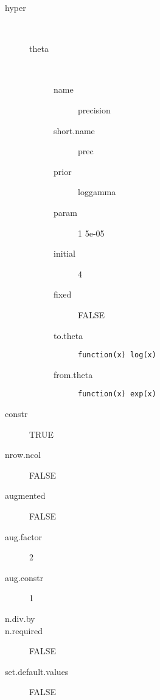 \begin{description}
	\item[hyper]\ 
	 \begin{description}
	 	\item[theta]\ 
	 	 \begin{description}
	 	 	 \item[ name ] precision 
	 	 	 \item[ short.name ] prec 
	 	 	 \item[ prior ] loggamma 
	 	 	 \item[ param ] 1 5e-05 
	 	 	 \item[ initial ] 4 
	 	 	 \item[ fixed ] FALSE 
	 	 	 \item[ to.theta ] \verb|function(x) log(x)| 
	 	 	 \item[ from.theta ] \verb|function(x) exp(x)| 
	 	 \end{description}
	 \end{description}
	 \item[ constr ] TRUE 
	 \item[ nrow.ncol ] FALSE 
	 \item[ augmented ] FALSE 
	 \item[ aug.factor ] 2 
	 \item[ aug.constr ] 1 
	 \item[ n.div.by ]  
	 \item[ n.required ] FALSE 
	 \item[ set.default.values ] FALSE 
\end{description}
